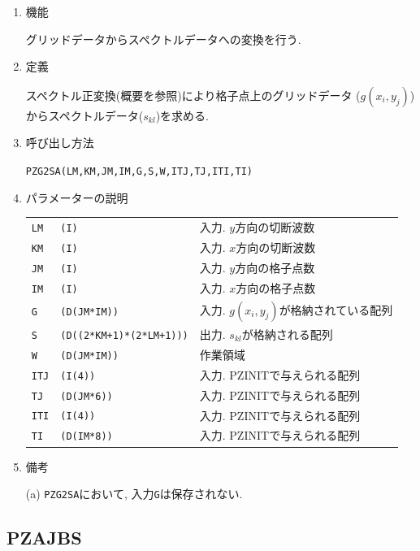 \documentclass[a4j,fleqn]{jarticle}
\begin{document}
\begin{enumerate}

\item 機能 

グリッドデータからスペクトルデータへの変換を行う.

\item 定義

スペクトル正変換(概要を参照)により格子点上のグリッドデータ
($g(x_i,y_j)$)からスペクトルデータ($s_{kl}$)を求める.

\item 呼び出し方法 

{\tt PZG2SA(LM,KM,JM,IM,G,S,W,ITJ,TJ,ITI,TI)}
  
\item パラメーターの説明

\begin{tabular}{lll}
{\tt LM} & {\tt (I)} & 入力. $y$方向の切断波数\\
{\tt KM} & {\tt (I)} & 入力. $x$方向の切断波数\\
{\tt JM} & {\tt (I)} & 入力. $y$方向の格子点数\\
{\tt IM} & {\tt (I)} & 入力. $x$方向の格子点数\\
{\tt G} & {\tt (D(JM*IM))} & 入力. $g(x_i,y_j)$が格納されている配列\\
{\tt S} & {\tt (D((2*KM+1)*(2*LM+1)))} & 出力. $s_{kl}$が格納される配列\\
{\tt W} & {\tt (D(JM*IM))} & 作業領域\\
{\tt ITJ} & {\tt (I(4))} & 入力. PZINITで与えられる配列\\
{\tt TJ} & {\tt (D(JM*6))} & 入力. PZINITで与えられる配列\\
{\tt ITI} & {\tt (I(4))} & 入力. PZINITで与えられる配列\\
{\tt TI} & {\tt (D(IM*8))} & 入力. PZINITで与えられる配列
\end{tabular}

\item 備考

(a) {\tt PZG2SA}において, 入力{\tt G}は保存されない.

\end{enumerate}


\subsection{PZAJBS}
\end{document}
